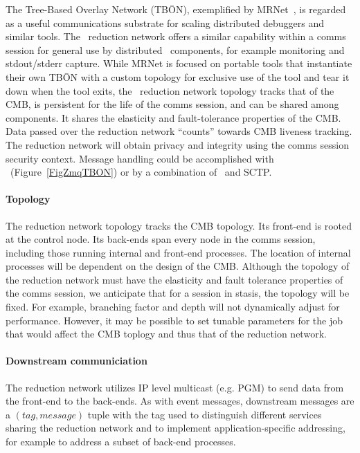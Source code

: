 The Tree-Based Overlay Network (TB\={O}N), exemplified by MRNet~\cite{MRNet},
is regarded as a useful communications substrate for scaling
distributed debuggers and similar tools.
The \ngrm\ reduction network offers a similar capability
within a comms session for general use by distributed \ngrm\ components,
for example monitoring and stdout/stderr capture.
While MRNet is focused on portable tools that instantiate their own TB\={O}N
with a custom topology for exclusive use of the tool and tear it down when
the tool exits,
the \ngrm\ reduction network topology tracks that of the CMB,
is persistent for the life of the comms session,
and can be shared among components.
It shares the elasticity and fault-tolerance properties of the CMB.
Data passed over the reduction network ``counts'' towards CMB liveness
tracking.
The reduction network will obtain privacy and integrity using the comms
session security context.
Message handling could be accomplished with
\zMQ\ (Figure~\ref{FigZmqTBON}) or by a combination of \zMQ\ and SCTP.

\paragraph{Topology}
The reduction network topology tracks the CMB topology.
Its front-end is rooted at the control node.
Its back-ends span every node in the comms session, including those
running internal and front-end processes.
The location of internal processes will be dependent on the design of
the CMB.
Although the topology of the reduction network must have the elasticity
and fault tolerance properties of the comms session,
we anticipate that for a session in stasis, the topology will be fixed.
For example, branching factor and depth will not dynamically adjust for
performance.
However, it may be possible to set tunable parameters for the job that
would affect the CMB toplogy and thus that of the reduction network.

\paragraph{Downstream communiciation}
\ifcomments
{}
\fi
The reduction network utilizes IP level multicast (e.g. PGM) to send
data from the front-end to the back-ends.
As with event messages, downstream messages are a
$(tag, message)$ tuple with the tag used to distinguish different
services sharing the reduction network and to implement application-specific
addressing, for example to address a subset of back-end processes.

